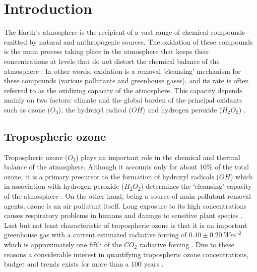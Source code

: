\documentclass[11pt,a4paper]{article}
\title{\mytitle}
\begin{document}


\tableofcontents
\newpage

\begin{abstract}
Abstract.
\end{abstract}

\section{Introduction} \label{sec:intro}
The Earth’s atmosphere is the recipient of a vast range of chemical compounds emitted by natural and anthropogenic sources. The oxidation of these compounds is the main process taking place in the atmosphere that keeps their concentrations at levels that do not distort the chemical balance of the atmosphere \citep{Prinn2003}. In other words, oxidation is a removal 'cleansing' mechanism for these compounds (various pollutants and greenhouse gases), and its rate is often referred to as the oxidizing capacity of the atmosphere. This capacity depends mainly on two factors: climate and the global burden of the principal oxidants such as ozone ($O_3$), the hydroxyl radical ($OH$) and hydrogen peroxide ($H_2O_2$) \citep{Prinn2003,Thompson1992}.

\subsection{Tropospheric ozone}
Tropospheric ozone ($O_3$) plays an important role in the chemical and thermal balance of the atmosphere. Although it accounts only for about 10\% of the total ozone, it is a primary precursor to the formation of hydroxyl radicals ($OH$) which in association with hydrogen peroxide ($H_2O_2$) determines the ‘cleansing’ capacity of the atmosphere \citep{Prinn2003,Tarasick2008,Thompson1992}. On the other hand, being a source of main pollutant removal agents, ozone is an air pollutant itself. Long exposure to its high concentrations causes respiratory problems in humans and damage to sensitive plant species \citep{Fowler2008}. Last but not least characteristic of tropospheric ozone is that it is an important greenhouse gas with a current estimated radiative forcing of  $0.40\pm 0.20~Wm^{–2}$ which is approximately one fifth of the $CO_2$ radiative forcing \citep{Hartmann2013,Myhre2013}. Due to these reasons a considerable interest in quantifying tropospheric ozone concentrations, budget and trends exists for more than a 100 years \citep{Becker2004}.
\end{document}
